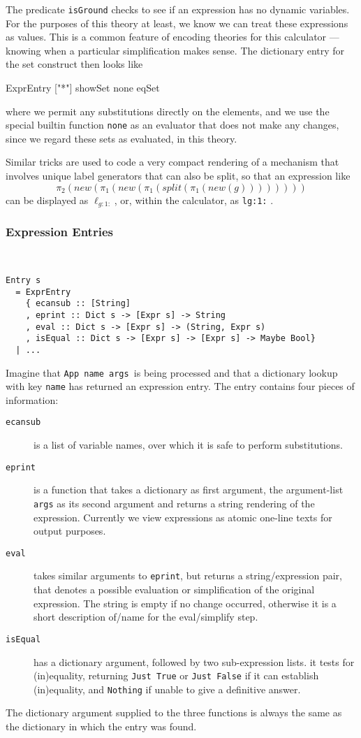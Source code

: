 The predicate \texttt{isGround} checks to see if an expression has no
dynamic variables.
For the purposes of this theory at least,
we know we can treat these expressions as values.
This is a common feature of encoding theories for this calculator%
---%
knowing when a particular simplification makes sense.
The dictionary entry for the set construct then looks like
\begin{code}
ExprEntry ["*"] showSet none eqSet
\end{code}
where we permit any substitutions directly on the elements,
and we use the special builtin function \texttt{none}
as an evaluator that does not make any changes,
since we regard these sets as evaluated, in this theory.

Similar tricks are used to code a very compact rendering
of a mechanism that involves unique label generators
that can also be split, so that an expression like
\[
 \pi_2(new(\pi_1(new(\pi_1(split(\pi_1(new(g))))))))
\]
can be displayed as $\ell_{g:1:}$, or,
within the calculator, as \texttt{lg:1:} .


\subsubsection{Expression Entries}~

\begin{verbatim}
Entry s
  = ExprEntry
    { ecansub :: [String]
    , eprint :: Dict s -> [Expr s] -> String
    , eval :: Dict s -> [Expr s] -> (String, Expr s)
    , isEqual :: Dict s -> [Expr s] -> [Expr s] -> Maybe Bool}
  | ...
\end{verbatim}
Imagine that \texttt{App name args }is being processed
and that a dictionary lookup with key \texttt{name}
has returned an expression entry.
The entry contains four pieces of information:
\begin{description}
  \item[\texttt{ecansub}]
     is a list of variable names,
      over which it is safe to perform substitutions.
  \item[\texttt{eprint}]
    is a function that takes a dictionary as first argument,
    the argument-list \texttt{args} as its second argument
    and returns a string rendering of the expression.
    Currently we view expressions as atomic one-line texts
    for output purposes.
  \item[\texttt{eval}]
    takes similar arguments to \texttt{eprint},
    but returns a string/expression pair,
    that denotes a possible evaluation or simplification
    of the original expression.
    The string is empty if no change occurred,
    otherwise it is a short description of/name for the eval/simplify step.
  \item[\texttt{isEqual}]
    has a dictionary argument, followed by two sub-expression lists.
    it tests for (in)equality, returning \texttt{Just True} or \texttt{Just False}
    if it can establish (in)equality,
    and \texttt{Nothing} if unable to give a definitive answer.
\end{description}
The dictionary argument supplied to the three functions
is always the same as the dictionary in which the entry was found.

